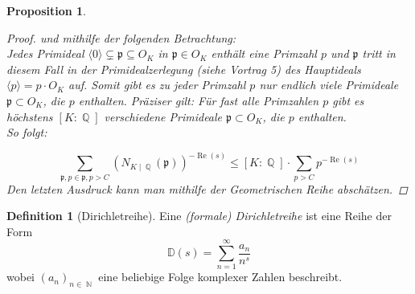 \documentclass[10pt,a4paper]{article}
\theoremstyle{plain}
\newtheorem{prop}[thm]{Proposition}
\theoremstyle{definition}
\newtheorem{defn}{Definition}[section]
\theoremstyle{remark}
\DeclareMathOperator{\Q}{\mathbb{Q}}
\DeclareMathOperator{\N}{\mathbb{N}}
\DeclareMathOperator{\re}{Re}
\begin{document}
\begin{prop}
\begin{proof}
und mithilfe der folgenden Betrachtung: \\Jedes Primideal $\langle0\rangle\subsetneq \mathfrak{p} \subseteq O_{\textit{K}}$ in $\mathfrak{p} \in O_K$ enthält eine Primzahl $p$ und $\mathfrak{p}$ tritt in diesem Fall in der Primidealzerlegung (siehe Vortrag 5) des Hauptideals $\langle p \rangle=p\cdot O_K$ auf. Somit gibt es zu jeder Primzahl $p$ nur endlich viele Primideale $\mathfrak{p}\subset O_K$, die $p$ enthalten. Präziser gilt: Für fast alle Primzahlen $p$ gibt es höchstens $[K\colon \Q]$ verschiedene Primideale $\mathfrak{p}\subset O_K$, die $p$ enthalten. 
\\
So folgt:

$$\sum_{\mathfrak{p},p\in \mathfrak{p},p>C}(N_{K\mid \Q}(\mathfrak{p}))^{-\re(s)} \leq [K\colon\Q]\cdot \sum_{p>C}p^{-\re(s)} $$Den letzten Ausdruck kann man mithilfe der Geometrischen Reihe abschätzen.
\end{proof}
\end{prop}


\begin{defn}[Dirichletreihe]

Eine \textit{(formale) Dirichletreihe} ist eine Reihe der Form $$\mathbb{D}(s) = \sum_{n =1}^{\infty}\frac{a_n}{n^s} $$ wobei $(a_n)_{n \in \N}$ eine beliebige Folge komplexer Zahlen beschreibt.

\end{defn}
\end{document}
